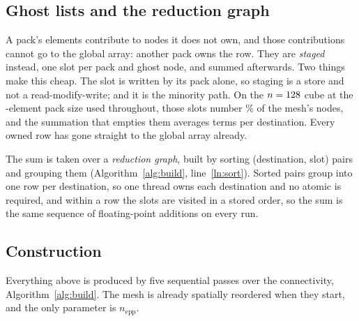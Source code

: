 \documentclass[sigconf,nonacm]{acmart}
\begin{document}
\subsection{Ghost lists and the reduction graph}
\label{sec:format:ghost}

A pack's elements contribute to nodes it does not own, and those contributions cannot go to the
global array: another pack owns the row. They are \emph{staged} instead, one slot per pack and
ghost node, and summed afterwards. Two things make this cheap. The slot is written by its pack
alone, so staging is a store and not a read-modify-write; and it is the minority path. On the
$n=128$ cube at the \fpPack-element pack size used throughout, those slots number
\fpGhostPct\% of the mesh's nodes, and the summation that empties them averages
\fpGhostPerRow{} terms per destination. Every owned row has gone straight to the global array
already.

The sum is taken over a \emph{reduction graph}, built by sorting (destination, slot) pairs and
grouping them (Algorithm~\ref{alg:build}, line~\ref{ln:sort}). Sorted pairs group into one row
per destination, so one thread owns each destination and no atomic is required, and within a
row the slots are visited in a stored order, so the sum is the same sequence of floating-point
additions on every run.

\subsection{Construction}
\label{sec:format:build}

Everything above is produced by five sequential passes over the connectivity,
Algorithm~\ref{alg:build}. The mesh is already spatially reordered when they start, and the only
parameter is $n_{\mathrm{epp}}$.
\end{document}
